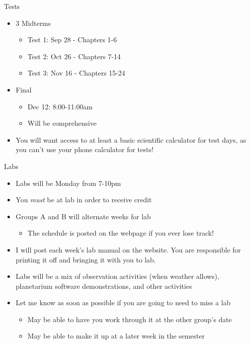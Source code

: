 \documentclass[pdf,aspectratio=169]{beamer}
\begin{document}
\begin{frame}{Tests}
  \begin{itemize}
	\item 3 Midterms
	  \begin{itemize}
		\item Test 1: Sep 28 - Chapters 1-6
		\item Test 2: Oct 26 - Chapters 7-14
		\item Test 3: Nov 16 - Chapters 15-24
	  \end{itemize}
	\item Final
	  \begin{itemize}
		\item Dec 12: 8:00-11:00am
		\item Will be comprehensive
	  \end{itemize}
	\item \alert{You will want access to at least a basic scientific calculator for test days, as you can't use your phone calculator for tests!}
  \end{itemize}
\end{frame}

\begin{frame}{Labs}
  \begin{itemize}
	\item Labs will be Monday from 7-10pm
	\item You \emph{must} be at lab in order to receive credit
	\item Groups A and B will alternate weeks for lab
		\begin{itemize}
			\item The schedule is posted on the webpage if you ever lose track!
		\end{itemize}
	\item I will post each week's lab manual on the website. You are responsible for printing it off and bringing it with you to lab.
	\item Labs will be a mix of observation activities (when weather allows), planetarium software demonstrations, and other activities
	\item Let me know as soon as possible if you are going to need to miss a lab
	  \begin{itemize}
		\item May be able to have you work through it at the other group's date
		\item May be able to make it up at a later week in the semester
	  \end{itemize}
  \end{itemize}
\end{frame}
\end{document}
